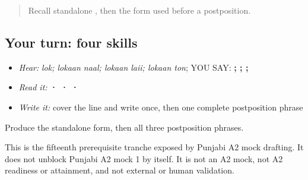 \begin{quote}
Recall standalone \textbf{}, then the form used before a postposition.
\end{quote}

\subsection*{Your turn: four skills}
\begin{itemize}
\raggedright
  \item \emph{Hear:} \emph{lok; lokaan naal; lokaan laii; lokaan ton}; YOU SAY: \textbf{;  ;  ;  }
  \item \emph{Read it:} \textbf{ ·   ·   ·  }
  \item \emph{Write it:} cover the line and write \textbf{} once, then one complete postposition phrase
\end{itemize}

\begin{tcolorbox}[breakable,colback=teal!4,colframe=teal!35!black,title={Before you move on}]
Produce the standalone form, then all three postposition phrases.

This is the fifteenth prerequisite tranche exposed by Punjabi A2 mock drafting. It does not unblock Punjabi A2 mock 1 by itself. It is not an A2 mock, not A2 readiness or attainment, and not external or human validation.
\end{tcolorbox}
